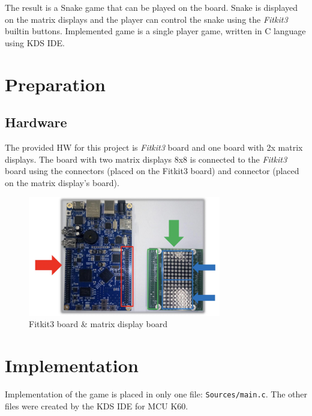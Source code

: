 \documentclass[a4paper, 11pt]{article}
\begin{document}
    The result is a Snake game that can be played on the board.
    Snake is displayed on the matrix displays and the player can control
    the snake using the \textit{Fitkit3} built\-in buttons.
    Implemented game is a single player game, written in C language using
    KDS IDE\cite{KDSIDE}.
    \newline





    \section{Preparation}\label{sec:preparation}


    \subsection{Hardware}\label{subsec:hardware}
    The provided HW for this project is \textit{Fitkit3} board and one
    board with 2x matrix displays.
    The board with two matrix displays 8x8 is connected to the
    \textit{Fitkit3} board using the connectors
        {\color{Green}{P1}} (placed on the Fitkit3 board) and connector
        {\color{Red}{P3}} (placed on the matrix display's board).

    \begin{figure}[h]
        \centering
        \includegraphics[width=0.75\textwidth]{equipments}
        \caption{Fitkit3 board \& matrix display board}\label{fig:figure1}
    \end{figure}




    \section{Implementation}\label{sec:implementation}
    Implementation of the game is placed in only one file: \texttt{Sources/main.c}.
    The other files were created by the KDS IDE for MCU K60.
\end{document}
